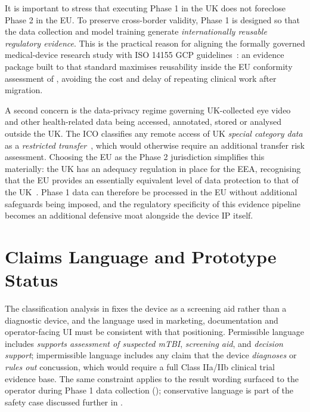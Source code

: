 It is important to stress that executing Phase 1 in the UK does not foreclose Phase 2 in the EU. To preserve cross-border validity, Phase 1 is designed so that the data collection and model training generate \emph{internationally reusable regulatory evidence}. This is the practical reason for aligning the formally governed medical-device research study with ISO 14155 GCP guidelines~\cite{iso14155}: an evidence package built to that standard maximises reusability inside the EU conformity assessment of , avoiding the cost and delay of repeating clinical work after migration.

A second concern is the data-privacy regime governing UK-collected eye video and other health-related data being accessed, annotated, stored or analysed outside the UK. The ICO classifies any remote access of UK \emph{special category data} as a \emph{restricted transfer}~\cite{ico_restricted_transfer}, which would otherwise require an additional transfer risk assessment. Choosing the EU as the Phase 2 jurisdiction simplifies this materially: the UK has an adequacy regulation in place for the EEA, recognising that the EU provides an essentially equivalent level of data protection to that of the UK~\cite{ico_adequacy_eea}. Phase 1 data can therefore be processed in the EU without additional safeguards being imposed, and the regulatory specificity of this evidence pipeline becomes an additional defensive moat alongside the device IP itself.


\section{Claims Language and Prototype Status}
\label{sec:ent-claims}

The classification analysis in  fixes the device as a screening aid rather than a diagnostic device, and the language used in marketing, documentation and operator-facing UI must be consistent with that positioning. Permissible language includes \emph{supports assessment of suspected mTBI}, \emph{screening aid}, and \emph{decision support}; impermissible language includes any claim that the device \emph{diagnoses} or \emph{rules out} concussion, which would require a full Class IIa/IIb clinical trial evidence base. The same constraint applies to the result wording surfaced to the operator during Phase 1 data collection (); conservative language is part of the safety case discussed further in .

